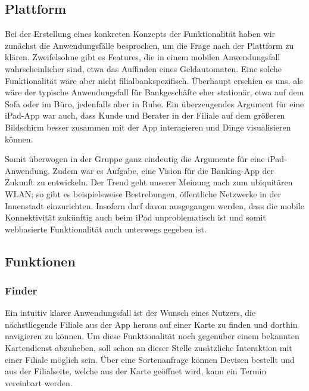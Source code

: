 \subsection{Plattform}
    Bei der Erstellung eines konkreten Konzepts der Funktionalität haben wir zunächst die Anwendungsfälle besprochen, um die Frage nach der Plattform zu klären. Zweifelsohne gibt es Features, die in einem mobilen Anwendungsfall wahrscheinlicher sind, etwa das Auffinden eines Geldautomaten. Eine solche Funktionalität wäre aber nicht filialbankspezifisch. Überhaupt erschien es uns, als wäre der typische Anwendungsfall für Bankgeschäfte eher stationär, etwa auf dem Sofa oder im Büro, jedenfalls aber in Ruhe. Ein überzeugendes Argument für eine iPad-App war auch, dass Kunde und Berater in der Filiale auf dem größeren Bildschirm besser zusammen mit der App interagieren und Dinge visualisieren können.     
    
    Somit überwogen in der Gruppe ganz eindeutig die Argumente für eine iPad-Anwendung. Zudem war es Aufgabe, eine Vision für die Banking-App der Zukunft zu entwickeln. Der Trend geht unserer Meinung nach zum ubiquitären WLAN; so gibt es beispielsweise Bestrebungen, öffentliche Netzwerke in der Innenstadt einzurichten. Insofern darf davon ausgegangen werden, dass die mobile Konnektivität zukünftig auch beim iPad unproblematisch ist und somit webbasierte Funktionalität auch unterwegs gegeben ist.
    
\subsection{Funktionen}
\subsubsection{Finder}
	Ein intuitiv klarer Anwendungsfall ist der Wunsch eines Nutzers, die nächstliegende Filiale aus der App heraus auf einer Karte zu finden und dorthin navigieren zu können. Um diese Funktionalität noch gegenüber einem bekannten Kartendienst abzuheben, soll schon an dieser Stelle zusätzliche Interaktion mit einer Filiale möglich sein. Über eine Sortenanfrage können Devisen bestellt und aus der Filialseite, welche aus der Karte geöffnet wird, kann ein Termin vereinbart werden.

